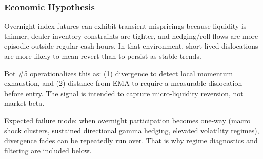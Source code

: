 \documentclass[11pt]{article}
\begin{document}
\subsubsection{Economic Hypothesis}\label{economic-hypothesis}

Overnight index futures can exhibit transient mispricings because
liquidity is thinner, dealer inventory constraints are tighter, and
hedging/roll flows are more episodic outside regular cash hours. In that
environment, short-lived dislocations are more likely to mean-revert
than to persist as stable trends.

Bot \#5 operationalizes this as: (1) divergence to detect local momentum
exhaustion, and (2) distance-from-EMA to require a measurable
dislocation before entry. The signal is intended to capture
micro-liquidity reversion, not market beta.

Expected failure mode: when overnight participation becomes one-way
(macro shock clusters, sustained directional gamma hedging, elevated
volatility regimes), divergence fades can be repeatedly run over. That
is why regime diagnostics and filtering are included below.
\end{document}
